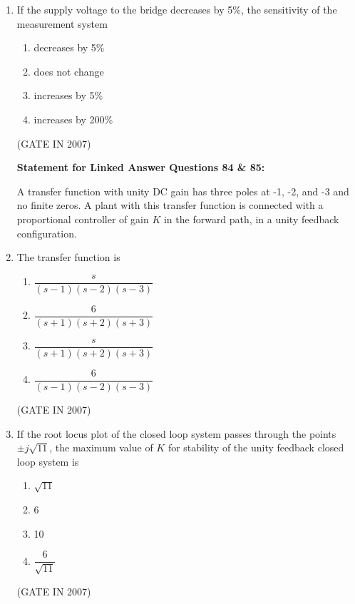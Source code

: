 \documentclass[journal]{IEEEtran}
\begin{document}
\begin{enumerate}
\item If the supply voltage to the bridge decreases by 5\%, the sensitivity of the measurement system
\begin{multicols}{2}
\begin{enumerate}
\item decreases by 5\%  
\item does not change  
\item increases by 5\%  
\item increases by 200\%  
\end{enumerate}
\end{multicols}
\hfill(GATE IN 2007)

\textbf{Statement for Linked Answer Questions 84 \& 85:}  

A transfer function with unity DC gain has three poles at -1, -2, and -3 and no finite zeros. A plant with this transfer function is connected with a proportional controller of gain $K$ in the forward path, in a unity feedback configuration.  

\item The transfer function is
\begin{multicols}{2}
\begin{enumerate}
\item $\dfrac{s}{(s-1)(s-2)(s-3)}$
\item $\dfrac{6}{(s+1)(s+2)(s+3)}$
\item $\dfrac{s}{(s+1)(s+2)(s+3)}$
\item $\dfrac{6}{(s-1)(s-2)(s-3)}$
\end{enumerate}
\end{multicols}
\hfill(GATE IN 2007)

\item If the root locus plot of the closed loop system passes through the points $\pm j\sqrt{11}$, the maximum value of $K$ for stability of the unity feedback closed loop system is
\begin{multicols}{4}
\begin{enumerate}
\item $\sqrt{11}$  
\item 6  
\item 10  
\item $\dfrac{6}{\sqrt{11}}$  
\end{enumerate}
\end{multicols}
\hfill(GATE IN 2007)

\end{enumerate}
\end{document}
